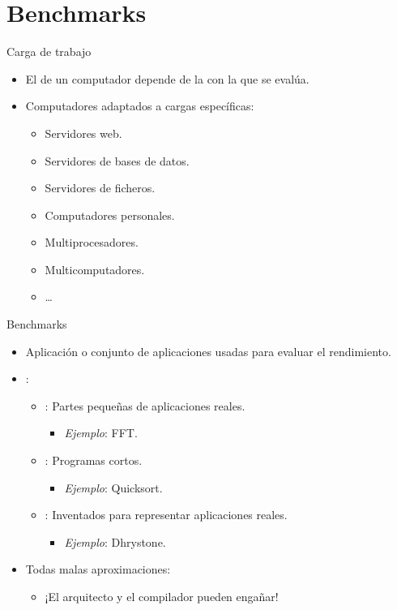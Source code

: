 \section{Benchmarks}

\begin{frame}[t]{Carga de trabajo}
\begin{itemize}
  \item El  de un computador depende de 
        la  con la que se evalúa.
  \item Computadores adaptados a cargas específicas:
    \begin{itemize}
      \item Servidores web.
      \item Servidores de bases de datos.
      \item Servidores de ficheros.
      \item Computadores personales.
      \item Multiprocesadores.
      \item Multicomputadores.
      \item \ldots
    \end{itemize}
\end{itemize}
\end{frame}

\begin{frame}[t]{Benchmarks}
\begin{itemize}
  \item Aplicación o conjunto de aplicaciones usadas para evaluar el rendimiento.
  \item {}:
    \begin{itemize}
      \item {}: Partes pequeñas de aplicaciones reales.
        \begin{itemize}
          \item \emph{Ejemplo}: FFT.
        \end{itemize}
      \item {}: Programas cortos.
        \begin{itemize}
          \item \emph{Ejemplo}: Quicksort.
        \end{itemize}
      \item {}: Inventados para representar aplicaciones reales.
        \begin{itemize}
          \item \emph{Ejemplo}: Dhrystone.
        \end{itemize}
    \end{itemize}
  \item Todas malas aproximaciones:
    \begin{itemize}
      \item \alert{¡El arquitecto y el compilador pueden engañar!}
    \end{itemize}
\end{itemize}
\end{frame}

